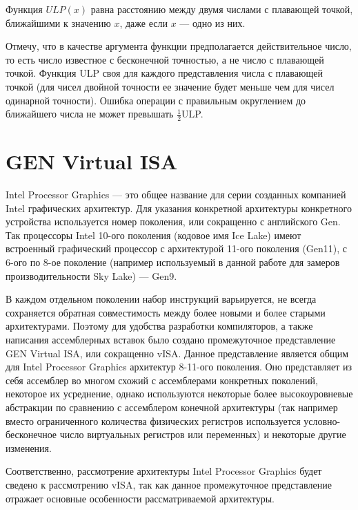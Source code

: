\begin{displayquote}
    Функция $ULP(x)$ равна расстоянию между двумя числами с плавающей точкой, ближайшими к значению $x$, даже если $x$ --- одно из них.
\end{displayquote}

Отмечу, что в качестве аргумента функции предполагается действительное число, то есть число известное с бесконечной точностью, а не число с плавающей точкой.
Функция ULP своя для каждого представления числа с плавающей точкой (для чисел двойной точности ее значение будет меньше чем для чисел одинарной точности).
Ошибка операции с правильным округлением до ближайшего числа не может превышать $\frac{1}{2}$ULP.

\section{\foreignlanguage{english}{GEN Virtual ISA}}

\foreignlanguage{english}{Intel Processor Graphics} --- это общее название для серии созданных компанией Intel графических архитектур.
Для указания конкретной архитектуры конкретного устройства используется номер поколения, или сокращенно с английского Gen.
Так процессоры Intel 10-ого поколения (кодовое имя Ice Lake) имеют встроенный графический процессор с архитектурой 11-ого поколения (Gen11), с 6-ого по 8-ое поколение (например используемый в данной работе для замеров производительности Sky Lake) --- Gen9.

В каждом отдельном поколении набор инструкций варьируется, не всегда сохраняется обратная совместимость между более новыми и более старыми архитектурами.
Поэтому для удобства разработки компиляторов, а также написания ассемблерных вставок было создано промежуточное представление \foreignlanguage{english}{GEN Virtual ISA}, или сокращенно vISA\cite{visa}.
Данное представление является общим для \foreignlanguage{english}{Intel Processor Graphics} архитектур 8-11-ого поколения.
Оно представляет из себя ассемблер во многом схожий с ассемблерами конкретных поколений, некоторое их усреднение, однако используются некоторые более высокоуровневые абстракции по сравнению с ассемблером конечной архитектуры (так например вместо ограниченного количества физических регистров используется условно-бесконечное число виртуальных регистров или переменных) и некоторые другие изменения.

Соответственно, рассмотрение архитектуры  \foreignlanguage{english}{Intel Processor Graphics} будет сведено к рассмотрению vISA, так как данное промежуточное представление отражает основные особенности рассматриваемой архитектуры.

